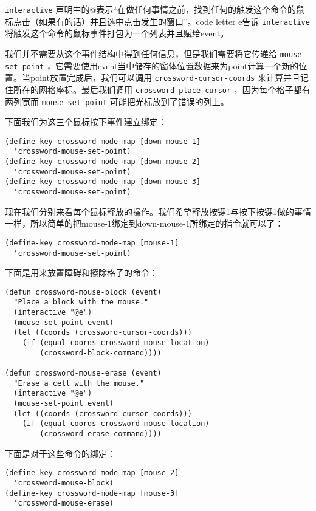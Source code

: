  \texttt{interactive} 声明中的@表示“在做任何事情之前，找到任何的触发这个命令的鼠标点击（如果有的话）并且选中点击发生的窗口”。code letter e告诉 \texttt{interactive} 将触发这个命令的鼠标事件打包为一个列表并且赋给event。

我们并不需要从这个事件结构中得到任何信息，但是我们需要将它传递给 \texttt{mouse-set-point} ，它需要使用event当中储存的窗体位置数据来为point计算一个新的位置。当point放置完成后，我们可以调用 \texttt{crossword-cursor-coords} 来计算并且记住所在的网格座标。最后我们调用 \texttt{crossword-place-cursor} ，因为每个格子都有两列宽而 \texttt{mouse-set-point} 可能把光标放到了错误的列上。

下面我们为这三个鼠标按下事件建立绑定：

\begin{verbatim}
(define-key crossword-mode-map [down-mouse-1]
  'crossword-mouse-set-point)
(define-key crossword-mode-map [down-mouse-2]
  'crossword-mouse-set-point)
(define-key crossword-mode-map [down-mouse-3]
  'crossword-mouse-set-point)
\end{verbatim}

现在我们分别来看每个鼠标释放的操作。我们希望释放按键1与按下按键1做的事情一样，所以简单的把mouse-1绑定到down-mouse-1所绑定的指令就可以了：

\begin{verbatim}
(define-key crossword-mode-map [mouse-1]
  'crossword-mouse-set-point)
\end{verbatim}

下面是用来放置障碍和擦除格子的命令：

\begin{verbatim}
(defun crossword-mouse-block (event)
  "Place a block with the mouse."
  (interactive "@e")
  (mouse-set-point event)
  (let ((coords (crossword-cursor-coords)))
    (if (equal coords crossword-mouse-location)
        (crossword-block-command))))

(defun crossword-mouse-erase (event)
  "Erase a cell with the mouse."
  (interactive "@e")
  (mouse-set-point event)
  (let ((coords (crossword-cursor-coords)))
    (if (equal coords crossword-mouse-location)
        (crossword-erase-command))))
\end{verbatim}

下面是对于这些命令的绑定：

\begin{verbatim}
(define-key crossword-mode-map [mouse-2]
  'crossword-mouse-block)
(define-key crossword-mode-map [mouse-3]
  'crossword-mouse-erase)
\end{verbatim}

